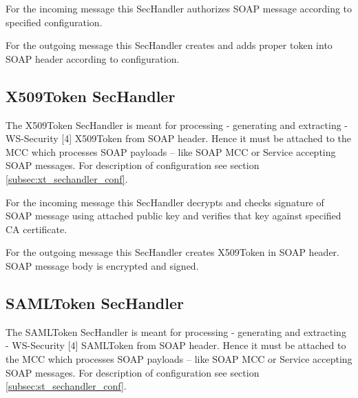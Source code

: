 \documentclass{article}                            %
\begin{document}
For the incoming message this SecHandler authorizes SOAP message according to specified configuration.

For the outgoing message this SecHandler creates and adds proper token into SOAP header according to configuration.

\subsection{X509Token SecHandler} %
\label{subsec:x509_token}
The X509Token SecHandler is meant for processing - generating and extracting - WS-Security [4] X509Token from SOAP header. Hence it must be attached to the MCC which processes SOAP payloads – like SOAP MCC or Service accepting SOAP messages. For description of configuration see section \ref{subsec:xt_sechandler_conf}.

For the incoming message this SecHandler decrypts and checks signature of SOAP message using attached public key and verifies that key against specified CA certificate.

For the outgoing message this SecHandler creates X509Token in SOAP header. SOAP message body is encrypted and signed.

\subsection{SAMLToken SecHandler} %
\label{subsec:saml_token}
The SAMLToken SecHandler is meant for processing - generating and extracting - WS-Security [4] SAMLToken from SOAP header. Hence it must be attached to the MCC which processes SOAP payloads – like SOAP MCC or Service accepting SOAP messages. For description of configuration see section \ref{subsec:st_sechandler_conf}.

\begin{figure}
\end{figure}
\end{document}
